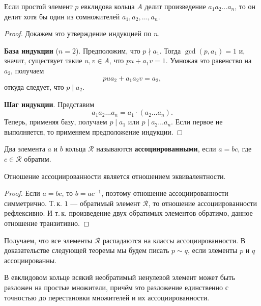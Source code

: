 \begin{lemma}
    Если простой элемент $p$ евклидова кольца $A$ делит произведение $a_1a_2\ldots a_n$, то он делит хотя бы один из сомножителей $a_1, a_2, \ldots, a_n$.
\end{lemma}

\begin{proof}
    Докажем это утверждение индукцией по $n$. 

    \textbf{База индукции} ($n = 2$). Предположим, что $p \nmid a_1$. Тогда $\gcd(p, a_1) = 1$ и, значит, существует такие $u, v \in A$, что $pu + a_1v = 1$. Умножая это равенство на $a_2$, получаем
    $$
    pua_2 + a_1a_2v = a_2,
    $$
    откуда следует, что $p \mid a_2$.

    \textbf{Шаг индукции}. Представим 
    $$
    a_1a_2\ldots a_n = a_1 \cdot (a_2\ldots a_n).
    $$
    Теперь, применяя базу, получаем $p \mid a_1$ или $p \mid a_2\ldots a_n$. Если первое не выполняется, то применяем предположение индукции.
\end{proof}

\begin{definition}
    Два элемента $a$ и $b$ кольца $\mathcal{R}$ называются \textbf{ассоциированными}, если $a = bc$, где $c \in \mathcal{R}$ обратим.
\end{definition}

\begin{statement}
    Отношение ассоциированности является отношением эквивалентности.
\end{statement}

\begin{proof}
    Если $a = bc$, то $b = ac^{-1}$, поэтому отношение ассоциированности симметрично. Т.\,к. $1$ --- обратимый элемент $\mathcal{R}$, то отношение ассоциированности рефлексивно. И т.\,к. произведение двух обратимых элементов обратимо, данное отношение транзитивно.
\end{proof}

\begin{remark}
    Получаем, что все элементы $\mathcal{R}$ распадаются на классы ассоциированности. В доказательстве следующей теоремы мы будем писать $p \sim q$, если элементы $p$ и $q$ ассоциированны.
\end{remark}

\begin{theorem}
    В евклидовом кольце всякий необратимый ненулевой элемент может быть разложен на простые множители, причём это разложение единственно с точностью до перестановки множителей и их ассоциированности.
\end{theorem}

